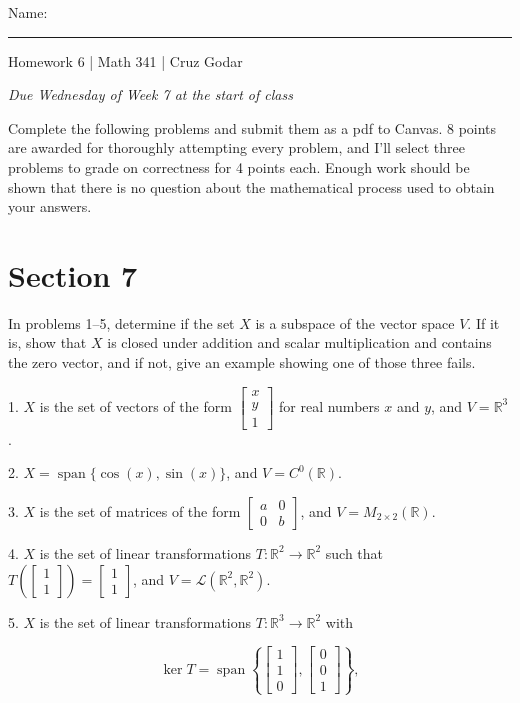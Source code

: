 \documentclass{article}
\begin{document}
\Large Name: \rule{2in}{0.15mm} \hfill Homework 6 | Math 341 | Cruz Godar \vspace{4pt}  \normalsize

\textit{Due Wednesday of Week 7 at the start of class}

Complete the following problems and submit them as a pdf to Canvas. 8 points are awarded for thoroughly attempting every problem, and I'll select three problems to grade on correctness for 4 points each. Enough work should be shown that there is no question about the mathematical process used to obtain your answers.

\section{Section 7}

In problems 1--5, determine if the set $X$ is a subspace of the vector space $V$. If it is, show that $X$ is closed under addition and scalar multiplication and contains the zero vector, and if not, give an example showing one of those three fails.

1. $X$ is the set of vectors of the form $\left[\begin{array}{c} x \\ y \\ 1 \end{array}\right]$ for real numbers $x$ and $y$, and $V = \mathbb{R}^3$.

2. $X = \operatorname{span} \{ \cos(x), \sin(x) \}$, and $V = C^0(\mathbb{R})$.

3. $X$ is the set of matrices of the form $\left[\begin{array}{cc} a& 0 \\ 0& b \end{array}\right]$, and $V = M_{2 \times 2}(\mathbb{R})$.

4. $X$ is the set of linear transformations $T : \mathbb{R}^2 \to \mathbb{R}^2$ such that $T \left( \left[\begin{array}{c} 1 \\ 1 \end{array}\right] \right) = \left[\begin{array}{c} 1 \\ 1 \end{array}\right]$, and $V = \mathcal{L}(\mathbb{R}^2, \mathbb{R}^2)$.

5. $X$ is the set of linear transformations $T : \mathbb{R}^3 \to \mathbb{R}^2$ with

$$
	\ker T = \operatorname{span}\left\{ \left[\begin{array}{c} 1 \\ 1 \\ 0 \end{array}\right], \left[\begin{array}{c} 0 \\ 0 \\ 1 \end{array}\right] \right\},
$$
\end{document}
